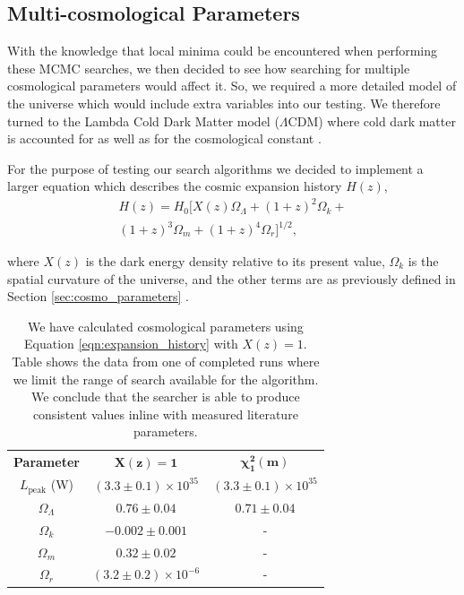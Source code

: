 \documentclass[twocolumn]{revtex4}
\begin{document}
{\vspace{-3ex}
\subsection{Multi-cosmological Parameters} 
\vspace{-2ex}
With the knowledge that local minima could be encountered when performing these MCMC searches, we then decided to see how searching for multiple cosmological parameters would affect it. So, we required a more detailed model of the universe which would include extra variables into our testing. We therefore turned to the Lambda Cold Dark Matter model ($\Lambda$CDM) where cold dark matter is accounted for as well as for the cosmological constant \cite{mod_ast}. 

For the purpose of testing our search algorithms we decided to implement a larger equation which describes the cosmic expansion history $H(z)$, 
\begin{multline}
H(z)=H_0[X(z)\Omega_\Lambda+(1+z)^2\Omega_k+\\
(1+z)^3\Omega_m+(1+z)^4\Omega_r]^{1/2},
\label{eqn:expansion_history}
\end{multline}

where $X(z)$ is the dark energy density relative to its present value, $\Omega_k$ is the spatial curvature of the universe, and the other terms are as previously defined in Section \ref{sec:cosmo_parameters} \cite{cosmo_constraints}.

{\renewcommand{\arraystretch}{1.2}%
\begin{table}[h!]
\centering
\begin{tabular}{c@{\hskip 15pt}c@{\hskip 15pt}c} 
 \hline
 \textbf{Parameter} & \textbf{$\boldsymbol{X(z)=1}$} & \textbf{$\boldsymbol{\chi^2_{1}(m)}$} \\ [0.5ex] 
 $L_{\text{peak}}$ (W) & $(3.3\pm0.1)\times 10^{35}$ & $(3.3\pm0.1)\times 10^{35}$ \\
 $\Omega_\Lambda$ & $0.76\pm0.04$ & $0.71\pm0.04$ \\
 $\Omega_k$ & $-0.002\pm0.001$ & -  \\
 $\Omega_m$ & $0.32\pm0.02$ & - \\
 $\Omega_r$ & $(3.2\pm0.2)\times10^{-6}$ & -  \\
 \hline
\end{tabular}
\caption{We have calculated cosmological parameters using Equation \ref{eqn:expansion_history} with $X(z)=1$. Table shows the data from one of completed runs where we limit the range of search available for the algorithm. We conclude that the searcher is able to produce consistent values inline with measured literature parameters.}
\vspace{-0.5em}
\label{table:extended_search}
\end{table}

}}
\end{document}
